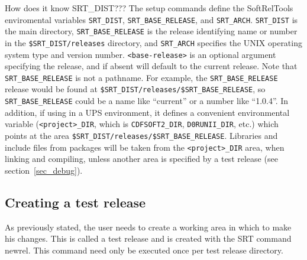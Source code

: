 \documentclass[12pt]{article}
\begin{document}
How does it know SRT\_DIST???
The setup commands define the  SoftRelTools enviromental variables 
\texttt{SRT\_DIST}, \texttt{SRT\_BASE\_RELEASE}, and \texttt{SRT\_ARCH}. 
\texttt{SRT\_DIST} is the
main directory, \texttt{SRT\_BASE\_RELEASE} is the release 
identifying name
or number in the \texttt{\$SRT\_DIST/releases} directory, and \texttt{SRT\_ARCH}
specifies the UNIX operating system type and version number.
\texttt{<base-release>} is an optional
argument specifying the release, and if absent will default to the current
release. Note that \texttt{SRT\_BASE\_RELEASE} is not
a pathname.  For example, the \texttt{SRT\_BASE\_RELEASE} release would be found at
\texttt{\$SRT\_DIST/releases/\$SRT\_BASE\_RELEASE}, so \texttt{SRT\_BASE\_RELEASE} could be a name 
like ``current'' or
a number like ``1.0.4''.  In addition, if using in a UPS environment, it 
defines a convenient 
environmental variable (\texttt{<project>\_DIR}, which is 
\texttt{CDFSOFT2\_DIR}, \texttt{D0RUNII\_DIR}, etc.) which 
points at the area \texttt{\$SRT\_DIST/releases/\$SRT\_BASE\_RELEASE}. 
Libraries and include 
files from packages will be taken from the \texttt{<project>\_DIR} area, 
when linking and compiling, unless another area is specified 
by a test release (see section~\ref{sec_debug}). 

\subsection{Creating a test release}
\label{sec_testrel}

As previously stated, the user needs to create a working area in which
to make his changes. This is called a test release and is created with
the SRT command newrel.  This command need only be executed once per
test release directory. 
\end{document}
